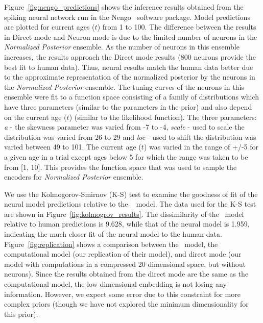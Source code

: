 \documentclass[10pt,letterpaper]{article}
\begin{document}
Figure~\ref{fig:nengo_predictions} shows the inference results obtained from the spiking neural network run in the Nengo~\cite{bekolay2014nengo} software package. Model predictions are plotted for current ages ($t$) from 1 to 100. The difference between the results in Direct mode and Neuron mode is due to the limited number of neurons in the \textit{Normalized Posterior} ensemble. As the number of neurons in this ensemble increases, the results approach the Direct mode results (800 neurons provide the best fit to human data). Thus, neural results match the human data better due to the approximate representation of the normalized posterior by the neurons in the \textit{Normalized Posterior} ensemble. The tuning curves of the neurons in this ensemble were fit to a function space consisting of a family of distributions which have three parameters (similar to the parameters in the prior) and also depend on the current age ($t$) (similar to the likelihood function). The three parameters: \textit{a} - the skewness parameter was varied from -7 to -4, \textit{scale} - used to scale the distribution was varied from 26 to 29 and \textit{loc} - used to shift the distribution was varied between 49 to 101. The current age ($t$) was varied in the range of +/-5 for a given age in a trial except ages below 5 for which the range was taken to be from [1, 10]. This provides the function space that was used to sample the encoders for \textit{Normalized Posterior} ensemble. 

We use the Kolmogorov-Smirnov (K-S) test to examine the goodness of fit of the neural model predictions relative to the ~ model. The data used for the K-S test are shown in Figure~\ref{fig:kolmogrov_results}. The dissimilarity of the~ model relative to human predictions is 9.628, while that of the neural model is 1.959, indicating the much closer fit of the neural model to the human data. Figure~\ref{fig:replication} shows a comparison between the~ model, the computational model (our replication of their model), and direct mode (our model with computations in a compressed 20 dimensional space, but without neurons). Since the results obtained from the direct mode are the same as the computational model, the low dimensional embedding is not losing any information. However, we expect some error due to this constraint for more complex priors (though we have not explored the minimum dimensionality for this prior). 
\end{document}
